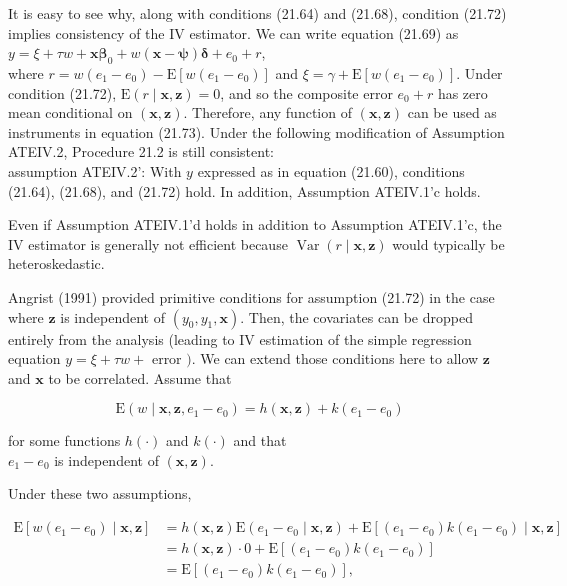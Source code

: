 \documentclass[10pt]{article}
\begin{document}
It is easy to see why, along with conditions (21.64) and (21.68), condition (21.72) implies consistency of the IV estimator. We can write equation (21.69) as\\
$y=\xi+\tau w+\mathbf{x} \boldsymbol{\beta}_{0}+w(\mathbf{x}-\boldsymbol{\psi}) \boldsymbol{\delta}+e_{0}+r$,\\
where $r=w\left(e_{1}-e_{0}\right)-\mathrm{E}\left[w\left(e_{1}-e_{0}\right)\right]$ and $\xi=\gamma+\mathrm{E}\left[w\left(e_{1}-e_{0}\right)\right]$. Under condition (21.72), $\mathrm{E}(r \mid \mathbf{x}, \mathbf{z})=0$, and so the composite error $e_{0}+r$ has zero mean conditional on $(\mathbf{x}, \mathbf{z})$. Therefore, any function of $(\mathbf{x}, \mathbf{z})$ can be used as instruments in equation (21.73). Under the following modification of Assumption ATEIV.2, Procedure 21.2 is still consistent:\\
assumption ATEIV.2': With $y$ expressed as in equation (21.60), conditions (21.64), (21.68), and (21.72) hold. In addition, Assumption ATEIV.1'c holds.

Even if Assumption ATEIV.1'd holds in addition to Assumption ATEIV.1'c, the IV estimator is generally not efficient because $\operatorname{Var}(r \mid \mathbf{x}, \mathbf{z})$ would typically be heteroskedastic.

Angrist (1991) provided primitive conditions for assumption (21.72) in the case where $\mathbf{z}$ is independent of $\left(y_{0}, y_{1}, \mathbf{x}\right)$. Then, the covariates can be dropped entirely from the analysis (leading to IV estimation of the simple regression equation $y= \xi+\tau w+$ error $)$. We can extend those conditions here to allow $\mathbf{z}$ and $\mathbf{x}$ to be correlated. Assume that


\begin{equation*}
\mathrm{E}\left(w \mid \mathbf{x}, \mathbf{z}, e_{1}-e_{0}\right)=h(\mathbf{x}, \mathbf{z})+k\left(e_{1}-e_{0}\right) \tag{21.74}
\end{equation*}


for some functions $h(\cdot)$ and $k(\cdot)$ and that\\
$e_{1}-e_{0}$ is independent of $(\mathbf{x}, \mathbf{z})$.

Under these two assumptions,


\begin{align*}
\mathrm{E}\left[w\left(e_{1}-e_{0}\right) \mid \mathbf{x}, \mathbf{z}\right] & =h(\mathbf{x}, \mathbf{z}) \mathrm{E}\left(e_{1}-e_{0} \mid \mathbf{x}, \mathbf{z}\right)+\mathrm{E}\left[\left(e_{1}-e_{0}\right) k\left(e_{1}-e_{0}\right) \mid \mathbf{x}, \mathbf{z}\right] \\
& =h(\mathbf{x}, \mathbf{z}) \cdot 0+\mathrm{E}\left[\left(e_{1}-e_{0}\right) k\left(e_{1}-e_{0}\right)\right] \\
& =\mathrm{E}\left[\left(e_{1}-e_{0}\right) k\left(e_{1}-e_{0}\right)\right], \tag{21.76}
\end{align*}
\end{document}
